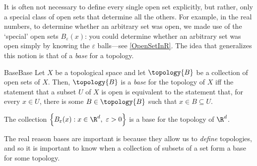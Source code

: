 It is often not necessary to define every single open set explicitly, but rather, only a special class of open sets that determine all the others.  For example, in the real numbers, to determine whether an arbitrary set was open, we made use of the `special' open sets $B_\varepsilon (x)$:  you could determine whether an arbitrary set was open simply by knowing the $\varepsilon$ balls---see \cref{OpenSetInR}.  The idea that generalizes this notion is that of a \emph{base} for a topology.
\begin{dfn}{Base}{Base}
Let $X$ be a topological space and let $\topology{B}$ be a collection of open sets of $X$.  Then, $\topology{B}$ is a \emph{base} for the topology of $X$ iff the statement that a subset $U$ of $X$ is open is equivalent to the statement that, for every $x\in U$, there is some $B\in \topology{B}$ such that $x\in B\subseteq U$.
\end{dfn}
\begin{exm}{}{}
The collection $\left\{ B_\varepsilon (x):x\in \R ^d,\ \varepsilon >0\right\}$ is a base for the topology of $\R ^d$.
\end{exm}
The real reason bases are important is because they allow us to \emph{define} topologies, and so it is important to know when a collection of subsets of a set form a base for some topology.
